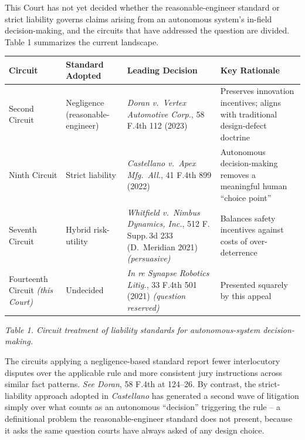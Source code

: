 


This Court has not yet decided whether the reasonable-engineer standard or strict liability governs claims arising from an autonomous system's in-field decision-making, and the circuits that have addressed the question are divided. Table 1 summarizes the current landscape.

\begin{center}
\small
\begin{tabular}{@{}p{1.35in}p{1.5in}p{1.55in}p{1.55in}@{}}
\toprule
\textbf{Circuit} & \textbf{Standard Adopted} & \textbf{Leading Decision} & \textbf{Key Rationale} \\
\midrule
Second Circuit & Negligence (reasonable-engineer) & \emph{Doran v.\ Vertex Automotive Corp.}, 58 F.4th 112 (2023) & Preserves innovation incentives; aligns with traditional design-defect doctrine \\
\addlinespace
Ninth Circuit & Strict liability & \emph{Castellano v.\ Apex Mfg.\ All.}, 41 F.4th 899 (2022)~\cite{castellano2022} & Autonomous decision-making removes a meaningful human ``choice point'' \\
\addlinespace
Seventh Circuit & Hybrid risk-utility & \emph{Whitfield v.\ Nimbus Dynamics, Inc.}, 512 F.\,Supp.\,3d 233 (D.\ Meridian 2021)~\cite{whitfield2021} \emph{(persuasive)} & Balances safety incentives against costs of over-deterrence \\
\addlinespace
\rowcolor{courtnavy!8}
Fourteenth Circuit \emph{(this Court)} & Undecided & \emph{In re Synapse Robotics Litig.}, 33 F.4th 501 (2021) \emph{(question reserved)} & Presented squarely by this appeal \\
\bottomrule
\end{tabular}

\vspace{4pt}
{\footnotesize\textit{Table 1. Circuit treatment of liability standards for autonomous-system decision-making.}}
\end{center}

The circuits applying a negligence-based standard report fewer interlocutory disputes over the applicable rule and more consistent jury instructions across similar fact patterns. \emph{See Doran}, 58 F.4th at 124--26. By contrast, the strict-liability approach adopted in \emph{Castellano} has generated a second wave of litigation simply over what counts as an autonomous ``decision'' triggering the rule -- a definitional problem the reasonable-engineer standard does not present, because it asks the same question courts have always asked of any design choice.

